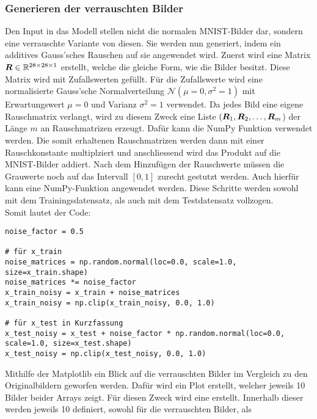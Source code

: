 \subsubsection{Generieren der verrauschten Bilder}
Den Input in das Modell stellen nicht die normalen MNIST-Bilder dar, sondern
eine verrauschte Variante von diesen. Sie werden nun generiert, indem ein
additives Gauss'sches Rauschen auf sie angewendet wird.
\para{}
Zuerst wird eine Matrix $\bm{R} \in \mathbb{R}^{28 \times 28 \times 1}$ erstellt, welche die gleiche Form, wie die
Bilder besitzt. Diese Matrix wird mit Zufallswerten gefüllt. Für die
Zufallswerte wird eine normalisierte Gauss'sche Normalverteilung
$\mathcal{N}(\mu = 0, \sigma^2 = 1)$ mit Erwartungswert $\mu = 0$ und Varianz
$\sigma^2 = 1$ verwendet. Da jedes Bild eine eigene Rauschmatrix verlangt,
wird zu diesem Zweck eine Liste $(\bm{R}_1,\bm{R}_2,\ldots,\bm{R}_m$) der Länge $m$ an
Rauschmatrizen erzeugt. Dafür kann die NumPy Funktion
 verwendet werden.
Die somit erhaltenen Rauschmatrizen werden dann mit einer Rauschkonstante
 multiplziert und anschliessend wird das Produkt auf die
MNIST-Bilder addiert.
Nach dem Hinzufügen der Rauschwerte müssen die Grauwerte noch auf das Intervall
$[0,1]$ zurecht gestutzt werden. Auch hierfür kann eine NumPy-Funktion
 angewendet werden. Diese Schritte werden sowohl mit dem
Trainingsdatensatz, als auch mit dem Testdatensatz vollzogen. \\
Somit lautet der Code:
\begin{verbatim}
noise_factor = 0.5

# für x_train
noise_matrices = np.random.normal(loc=0.0, scale=1.0, size=x_train.shape)
noise_matrices *= noise_factor
x_train_noisy = x_train + noise_matrices
x_train_noisy = np.clip(x_train_noisy, 0.0, 1.0)

# für x_test in Kurzfassung
x_test_noisy = x_test + noise_factor * np.random.normal(loc=0.0, scale=1.0, size=x_test.shape)
x_test_noisy = np.clip(x_test_noisy, 0.0, 1.0)
\end{verbatim}
\para{}
Mithilfe der Matplotlib ein Blick auf die verrauschten Bilder im Vergleich zu
den Originalbildern geworfen werden.
Dafür wird ein Plot erstellt, welcher jeweils 10 Bilder beider Arrays zeigt.
\para{}
Für diesen Zweck wird eine  erstellt. Innerhalb dieser
werden jeweils 10  definiert, sowohl für die verrauschten Bilder, als
